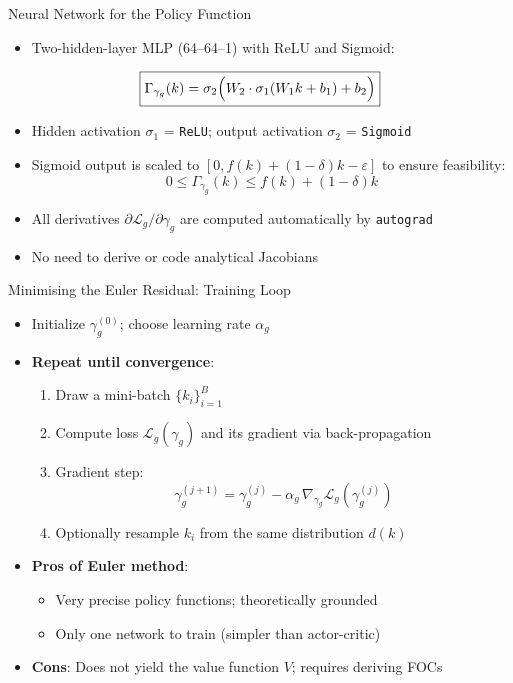 \documentclass[10pt,english,aspectratio=169]{beamer}
\begin{document}
\begin{frame}{Neural Network for the Policy Function}
\begin{itemize}
  \item Two-hidden-layer MLP (64--64--1) with ReLU and Sigmoid:
\end{itemize}
\[
  \boxed{
    \Gamma_{\gamma_g}(k) = \sigma_2\Bigl(W_2 \cdot \sigma_1(W_1 k + b_1) + b_2\Bigr)
  }
\]
\begin{itemize}
  \item Hidden activation $\sigma_1$ = \texttt{ReLU}; output activation $\sigma_2$ = \texttt{Sigmoid}
  \item Sigmoid output is scaled to $[0, f(k) + (1-\delta)k - \varepsilon]$ to ensure feasibility:
    \[
      0 \leq \Gamma_{\gamma_g}(k) \leq f(k) + (1-\delta)k
    \]
  \medskip
  \item All derivatives $\partial \mathcal{L}_g / \partial \gamma_g$ are computed automatically by \texttt{autograd}
  \item No need to derive or code analytical Jacobians
\end{itemize}
\end{frame}

\begin{frame}{Minimising the Euler Residual: Training Loop}
\begin{itemize}
  \item Initialize $\gamma_g^{(0)}$; choose learning rate $\alpha_g$
  \medskip
  \item \textbf{Repeat until convergence}:
    \begin{enumerate}
      \item Draw a mini-batch $\{k_i\}_{i=1}^{B}$
      \item Compute loss $\mathcal{L}_g(\gamma_g)$ and its gradient via back-propagation
      \item Gradient step:
        \[
          \gamma_g^{(j+1)} = \gamma_g^{(j)} - \alpha_g\, \nabla_{\gamma_g} \mathcal{L}_g(\gamma_g^{(j)})
        \]
      \item Optionally resample $k_i$ from the same distribution $d(k)$
    \end{enumerate}
  \medskip
  \item \textbf{Pros of Euler method}:
    \begin{itemize}
      \item Very precise policy functions; theoretically grounded
      \item Only one network to train (simpler than actor-critic)
    \end{itemize}
  \item \textbf{Cons}: Does not yield the value function $V$; requires deriving FOCs
\end{itemize}
\end{frame}
\end{document}
